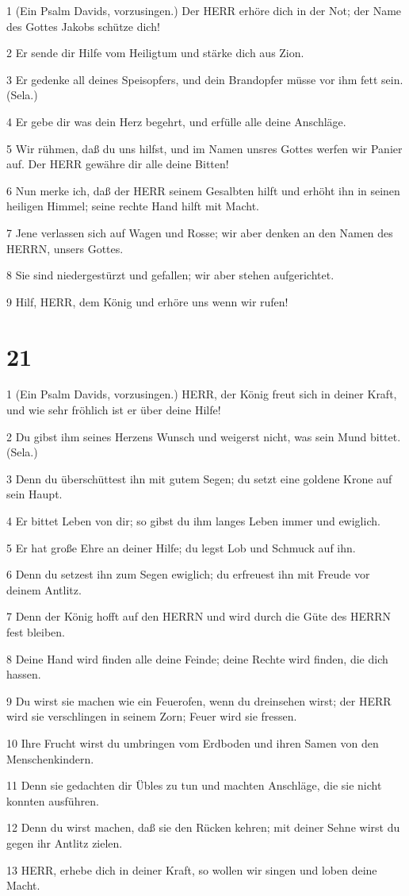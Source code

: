 \par 1 (Ein Psalm Davids, vorzusingen.) Der HERR erhöre dich in der Not; der Name des Gottes Jakobs schütze dich!
\par 2 Er sende dir Hilfe vom Heiligtum und stärke dich aus Zion.
\par 3 Er gedenke all deines Speisopfers, und dein Brandopfer müsse vor ihm fett sein. (Sela.)
\par 4 Er gebe dir was dein Herz begehrt, und erfülle alle deine Anschläge.
\par 5 Wir rühmen, daß du uns hilfst, und im Namen unsres Gottes werfen wir Panier auf. Der HERR gewähre dir alle deine Bitten!
\par 6 Nun merke ich, daß der HERR seinem Gesalbten hilft und erhöht ihn in seinen heiligen Himmel; seine rechte Hand hilft mit Macht.
\par 7 Jene verlassen sich auf Wagen und Rosse; wir aber denken an den Namen des HERRN, unsers Gottes.
\par 8 Sie sind niedergestürzt und gefallen; wir aber stehen aufgerichtet.
\par 9 Hilf, HERR, dem König und erhöre uns wenn wir rufen!

\chapter{21}

\par 1 (Ein Psalm Davids, vorzusingen.) HERR, der König freut sich in deiner Kraft, und wie sehr fröhlich ist er über deine Hilfe!
\par 2 Du gibst ihm seines Herzens Wunsch und weigerst nicht, was sein Mund bittet. (Sela.)
\par 3 Denn du überschüttest ihn mit gutem Segen; du setzt eine goldene Krone auf sein Haupt.
\par 4 Er bittet Leben von dir; so gibst du ihm langes Leben immer und ewiglich.
\par 5 Er hat große Ehre an deiner Hilfe; du legst Lob und Schmuck auf ihn.
\par 6 Denn du setzest ihn zum Segen ewiglich; du erfreuest ihn mit Freude vor deinem Antlitz.
\par 7 Denn der König hofft auf den HERRN und wird durch die Güte des HERRN fest bleiben.
\par 8 Deine Hand wird finden alle deine Feinde; deine Rechte wird finden, die dich hassen.
\par 9 Du wirst sie machen wie ein Feuerofen, wenn du dreinsehen wirst; der HERR wird sie verschlingen in seinem Zorn; Feuer wird sie fressen.
\par 10 Ihre Frucht wirst du umbringen vom Erdboden und ihren Samen von den Menschenkindern.
\par 11 Denn sie gedachten dir Übles zu tun und machten Anschläge, die sie nicht konnten ausführen.
\par 12 Denn du wirst machen, daß sie den Rücken kehren; mit deiner Sehne wirst du gegen ihr Antlitz zielen.
\par 13 HERR, erhebe dich in deiner Kraft, so wollen wir singen und loben deine Macht.


